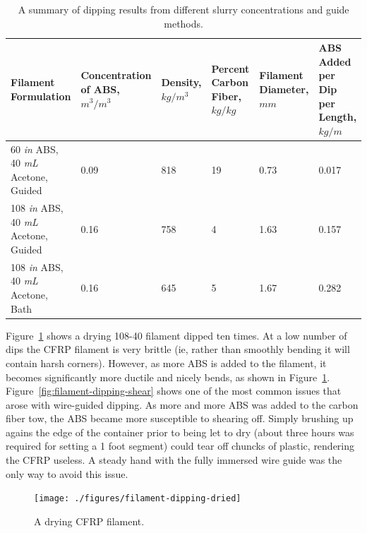 \begin{table}[h!]
    \centering
    \begin{tabular}{p{1.5in}|p{1in}|p{0.75in}|p{0.75in}|p{0.75in}|p{0.75in}}
        Filament Formulation & Concentration of ABS, $m^3/m^3$ & Density, $kg/m^3$ & Percent Carbon Fiber, $kg/kg$ & Filament Diameter, $mm$ & ABS Added per Dip per Length, $kg/m$  \\ \hline \hline
        60 \textit{in} ABS, 40 \textit{mL} Acetone, Guided & 0.09 & 818 & 19 & 0.73 & 0.017 \\ \hline
        108 \textit{in} ABS, 40 \textit{mL} Acetone, Guided & 0.16 & 758 & 4 & 1.63 & 0.157 \\ \hline
        108 \textit{in} ABS, 40 \textit{mL} Acetone, Bath & 0.16 & 645 & 5 & 1.67 & 0.282 \\
 
    \end{tabular}
    \caption{A summary of dipping results from different slurry concentrations and guide methods.}
    \label{tab:dipping-results}
\end{table}


Figure~\ref{fig:filament-dipping-dried} shows a drying 108-40 filament dipped ten times. At a low number of dips the CFRP filament is very brittle (ie, rather than smoothly bending it will contain harsh corners). However, as more ABS is added to the filament, it becomes significantly more ductile and nicely bends, as shown in Figure~\ref{fig:filament-dipping-dried}. Figure~\ref{fig:filament-dipping-shear} shows one of the most common issues that arose with wire-guided dipping. As more and more ABS was added to the carbon fiber tow, the ABS became more susceptible to shearing off. Simply brushing up agains the edge of the container prior to being let to dry (about three hours was required for setting a 1 foot segment) could tear off chuncks of plastic, rendering the CFRP useless. A steady hand with the fully immersed wire guide was the only way to avoid this issue.\\

\begin{figure}[htp]
    \centering
    \texttt{[image: ./figures/filament-dipping-dried]}
    \caption{A drying CFRP filament.}
    \label{fig:filament-dipping-dried}
\end{figure}

